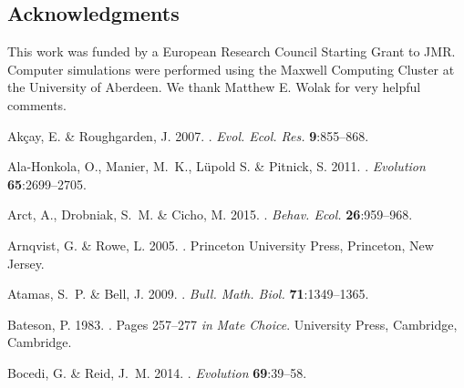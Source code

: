 \documentclass[10pt,letterpaper]{article}
\begin{document}
\subsection*{Acknowledgments}

This work was funded by a European Research Council Starting Grant to JMR. Computer simulations were performed using the Maxwell Computing Cluster at the University of Aberdeen. We thank Matthew E. Wolak for very helpful comments.

\begin{small}

\begin{thebibliography}{73}
\providecommand{\natexlab}[1]{#1}

Ak{\c{c}}ay, E. \& Roughgarden, J. 2007.
.
\newblock \textit{Evol. Ecol. Res.} \textbf{9}:855--868.

Ala-Honkola, O., Manier, M.~K., L{\"{u}}pold S. \& Pitnick, S. 2011.
.
\newblock \textit{Evolution} \textbf{65}:2699--2705.

Arct, A., Drobniak, S.~M. \& Cicho, M. 2015.
.
\newblock \textit{Behav. Ecol.} \textbf{26}:959--968.

Arnqvist, G. \& Rowe, L. 2005.
.
\newblock Princeton University Press, Princeton, New Jersey.

Atamas, S.~P. \& Bell, J. 2009.
.
\newblock \textit{Bull. Math. Biol.} \textbf{71}:1349--1365.

Bateson, P. 1983.
.
\newblock Pages 257--277 \emph{in} \textit{Mate Choice}. University Press, Cambridge,
  Cambridge.

Bocedi, G. \& Reid, J.~M. 2014.
.
\newblock \textit{Evolution} \textbf{69}:39--58.


\end{thebibliography}
\end{small}
\end{document}
